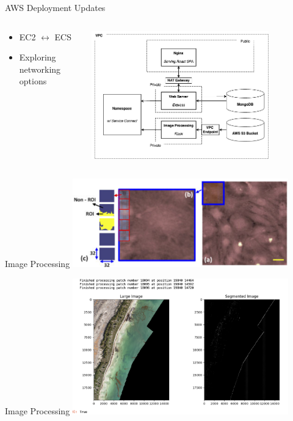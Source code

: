 \begin{frame}{AWS Deployment Updates}
    \begin{columns}
        \begin{column}{0.3\textwidth}
            \begin{itemize}
                \item EC2 $\leftrightarrow$ ECS
                \item Exploring networking options
            \end{itemize}  
        \end{column}
        \begin{column}{0.7\textwidth}
            \centering
            \includegraphics[height=0.8\textheight,width=0.8\textwidth,keepaspectratio]{images/mm_system_2.png}
        \end{column}
    \end{columns}
\end{frame}

\begin{frame}{Image Processing}
    \centering
    \includegraphics[height=0.7\textheight,width=0.7\textwidth,keepaspectratio]{images/mm_sliding_and_patching.png}
\end{frame}

\begin{frame}{Image Processing}
    \centering
    \includegraphics[height=0.7\textheight,width=0.7\textwidth,keepaspectratio]{images/mm_patch.png}
\end{frame}

